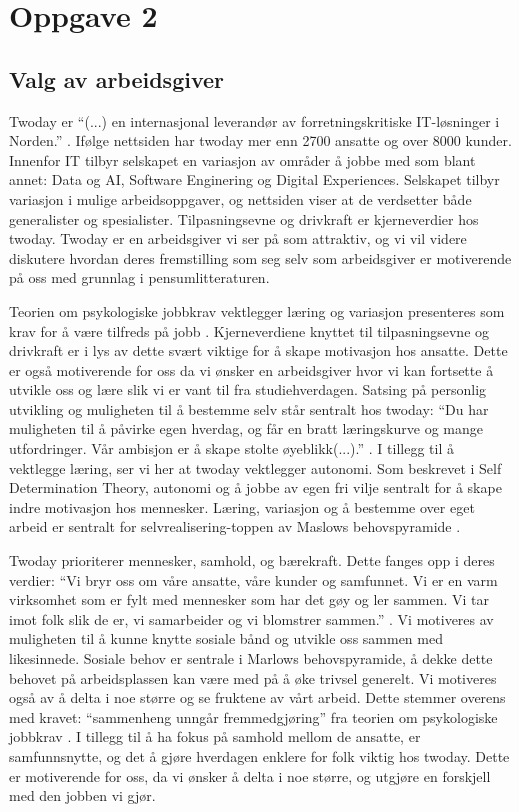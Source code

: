 \section{Oppgave 2}
\subsection{Valg av arbeidsgiver}
Twoday er \enquote{(...) en internasjonal leverandør av forretningskritiske IT-løsninger i Norden.}
\parencite{Twoday.no}. Ifølge nettsiden har twoday mer enn 2700 ansatte og over 8000 kunder. Innenfor IT
tilbyr selskapet en variasjon av områder å jobbe med som blant annet: Data og AI, Software Enginering
og Digital Experiences. Selskapet tilbyr variasjon i mulige arbeidsoppgaver, og nettsiden viser at de
verdsetter både generalister og spesialister. Tilpasningsevne og drivkraft er kjerneverdier hos twoday. Twoday er
en arbeidsgiver vi ser på som attraktiv, og vi vil videre diskutere hvordan deres fremstilling som seg selv som 
arbeidsgiver er motiverende på oss med grunnlag i pensumlitteraturen. 

Teorien om psykologiske jobbkrav vektlegger læring og variasjon presenteres som krav for å være tilfreds på jobb \parencite[][s.120]{Teknologiledelse}. 
Kjerneverdiene knyttet til tilpasningsevne og drivkraft er i lys av dette svært viktige for å skape motivasjon hos ansatte. Dette er også motiverende for 
oss da vi ønsker en arbeidsgiver hvor vi kan fortsette å utvikle oss og lære slik vi er vant til fra studiehverdagen.
Satsing på personlig utvikling og muligheten til å bestemme selv står sentralt hos twoday: \enquote{Du har muligheten
til å påvirke egen hverdag, og får en bratt læringskurve og mange utfordringer. Vår ambisjon er å
skape stolte øyeblikk(...).} \parencite["Graduateprogrammet"]{Twoday.no}. I tillegg til å vektlegge læring, ser
vi her at twoday vektlegger autonomi. Som beskrevet i Self Determination Theory\parencite[][s.121]{Teknologiledelse},
autonomi og å jobbe av egen fri vilje sentralt for å skape indre motivasjon hos mennesker. Læring,
variasjon og å bestemme over eget arbeid er sentralt for selvrealisering-toppen av Maslows
behovspyramide \parencite[][s.116]{Teknologiledelse}.

Twoday prioriterer mennesker, samhold, og bærekraft. Dette fanges opp i deres verdier:
“Vi bryr oss om våre ansatte, våre kunder og samfunnet. Vi er en varm virksomhet som er fylt
med mennesker som har det gøy og ler sammen. Vi tar imot folk slik de er, vi samarbeider og vi
blomstrer sammen.” \parencite["Om oss"]{Twoday.no}. Vi motiveres av muligheten til å kunne knytte sosiale bånd
og utvikle oss sammen med likesinnede. Sosiale behov er sentrale i Marlows behovspyramide, å dekke
dette behovet på arbeidsplassen kan være med på å øke trivsel generelt. Vi motiveres også av å delta
i noe større og se fruktene av vårt arbeid. Dette stemmer overens med kravet: “sammenheng unngår
fremmedgjøring” fra teorien om psykologiske jobbkrav \parencite[][s.120]{Teknologiledelse}. I tillegg til å ha fokus på samhold
mellom de ansatte, er samfunnsnytte, og det å gjøre hverdagen enklere for folk viktig hos
twoday\parencite["Graduateprogrammet"]{Twoday.no}. Dette er motiverende for oss, da vi ønsker å delta i noe
større, og utgjøre en forskjell med den jobben vi gjør.


